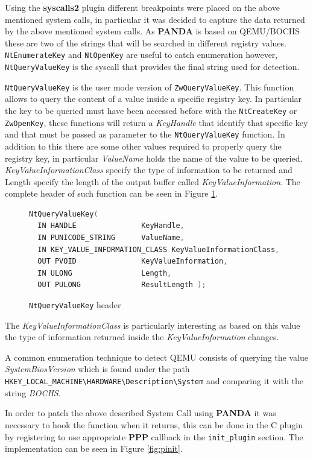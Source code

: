Using the \textbf{syscalls2} plugin different breakpoints were placed on the above mentioned system calls, in particular it was decided to capture the data returned by the above mentioned system calls. As \textbf{PANDA} is based on QEMU/BOCHS these are two of the strings that will be searched in different registry values. \lstinline{NtEnumerateKey} and \lstinline{NtOpenKey} are useful to catch enumeration however, \lstinline{NtQueryValueKey} is the syscall that provides the final string used for detection.

\lstinline{NtQueryValueKey} is the user mode version of \lstinline{ZwQueryValueKey}. This function allows to query the content of a value inside a specific registry key. In particular the key to be queried must have been accessed before with the \lstinline{NtCreateKey} or \lstinline{ZwOpenKey}, these functions will return a \textit{KeyHandle} that identify that specific key and that must be passed as parameter to the \lstinline{NtQueryValueKey} function. In addition to this there are some other values required to properly query the registry key, in particular \textit{ValueName} holds the name of the value to be queried. \textit{KeyValueInformationClass} specify the type of information to be returned and Length specify the length of the output buffer called \textit{KeyValueInformation}. The complete header of such function can be seen in Figure \ref{fig:querykey}.

\begin{figure}[htp]
\centering
\begin{lstlisting}[language=C]
NtQueryValueKey(
  IN HANDLE               KeyHandle,
  IN PUNICODE_STRING      ValueName,
  IN KEY_VALUE_INFORMATION_CLASS KeyValueInformationClass,
  OUT PVOID               KeyValueInformation,
  IN ULONG                Length,
  OUT PULONG              ResultLength );
\end{lstlisting}
\caption{\lstinline{NtQueryValueKey} header}
\label{fig:querykey}
\end{figure}

The \textit{KeyValueInformationClass} is particularly interesting as based on this value the type of information returned inside the \textit{KeyValueInformation} changes.

A common enumeration technique to detect QEMU consists of querying the value \textit{SystemBiosVersion} which is found under the path \lstinline{HKEY_LOCAL_MACHINE\HARDWARE\Description\System} and comparing it with the string \textit{BOCHS}.

In order to patch the above described System Call using \textbf{PANDA} it was necessary to hook the function when it returns, this can be done in the C plugin by registering to use appropriate \textbf{PPP} callback in the \lstinline{init_plugin} section. The implementation can be seen in Figure \ref{fig:pinit}.

